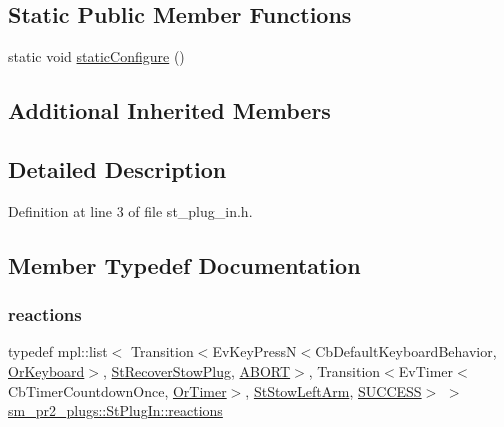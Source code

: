 \subsection*{Static Public Member Functions}
\begin{DoxyCompactItemize}
\item 
static void \hyperlink{structsm__pr2__plugs_1_1StPlugIn_a9098d683bdfaed2a78da207828faa227}{static\+Configure} ()
\end{DoxyCompactItemize}
\subsection*{Additional Inherited Members}


\subsection{Detailed Description}


Definition at line 3 of file st\+\_\+plug\+\_\+in.\+h.



\subsection{Member Typedef Documentation}
\mbox{\label{structsm__pr2__plugs_1_1StPlugIn_a8af73855d8085eb54ef4052001a783d4}} 
\subsubsection{\texorpdfstring{reactions}{reactions}}
{\footnotesize\ttfamily typedef mpl\+::list$<$ Transition$<$Ev\+Key\+PressN$<$Cb\+Default\+Keyboard\+Behavior, \hyperlink{classsm__pr2__plugs_1_1OrKeyboard}{Or\+Keyboard}$>$, \hyperlink{structsm__pr2__plugs_1_1StRecoverStowPlug}{St\+Recover\+Stow\+Plug}, \hyperlink{classABORT}{A\+B\+O\+RT}$>$, Transition$<$Ev\+Timer$<$Cb\+Timer\+Countdown\+Once, \hyperlink{classsm__pr2__plugs_1_1OrTimer}{Or\+Timer}$>$, \hyperlink{structsm__pr2__plugs_1_1StStowLeftArm}{St\+Stow\+Left\+Arm}, \hyperlink{classSUCCESS}{S\+U\+C\+C\+E\+SS}$>$ $>$ \hyperlink{structsm__pr2__plugs_1_1StPlugIn_a8af73855d8085eb54ef4052001a783d4}{sm\+\_\+pr2\+\_\+plugs\+::\+St\+Plug\+In\+::reactions}}



